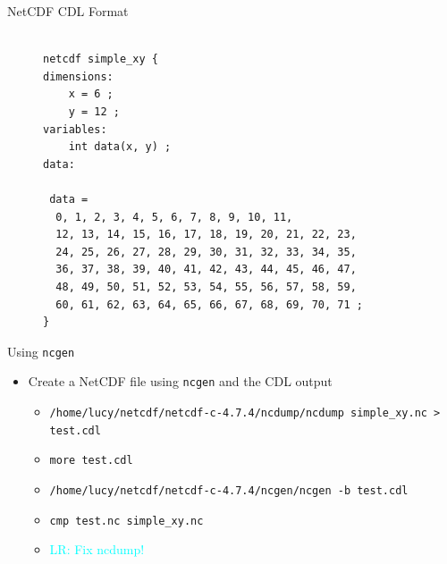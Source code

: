 \documentclass[compress,11pt,xcolor=svgnames,aspectratio=169]{beamer}
\newcommand{\lr}[1]{\textcolor{cyan}{LR: #1}}
\begin{document}
\begin{frame}[fragile]{NetCDF CDL Format}

\begin{figure}
\centering
\begin{varwidth}{\linewidth}
{\footnotesize

\begin{verbatim}

netcdf simple_xy {
dimensions:
	x = 6 ;
	y = 12 ;
variables:
	int data(x, y) ;
data:

 data =
  0, 1, 2, 3, 4, 5, 6, 7, 8, 9, 10, 11,
  12, 13, 14, 15, 16, 17, 18, 19, 20, 21, 22, 23,
  24, 25, 26, 27, 28, 29, 30, 31, 32, 33, 34, 35,
  36, 37, 38, 39, 40, 41, 42, 43, 44, 45, 46, 47,
  48, 49, 50, 51, 52, 53, 54, 55, 56, 57, 58, 59,
  60, 61, 62, 63, 64, 65, 66, 67, 68, 69, 70, 71 ;
}

\end{verbatim}

}
\end{varwidth}
\end{figure}

\end{frame}

\begin{frame}[fragile]{Using \texttt{ncgen}}

\begin{itemize}

  \item Create a NetCDF file using \verb|ncgen| and the CDL output

    \begin{itemize}

      \item \verb|/home/lucy/netcdf/netcdf-c-4.7.4/ncdump/ncdump simple_xy.nc > test.cdl|
      \item \verb|more test.cdl|
      \item \verb|/home/lucy/netcdf/netcdf-c-4.7.4/ncgen/ncgen -b test.cdl|
      \item \verb|cmp test.nc simple_xy.nc|
      \item \lr{Fix ncdump!}

    \end{itemize}

\end{itemize}

\end{frame}
\end{document}
